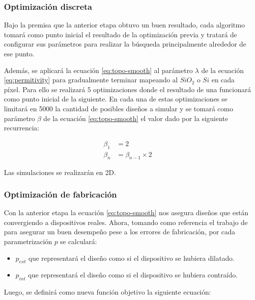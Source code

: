 \subsubsection{Optimización discreta}

Bajo la premisa que la anterior etapa obtuvo un buen resultado, cada algoritmo tomará como punto inicial el resultado de la optimización previa y tratará de configurar sus parámetros para realizar la búsqueda principalmente alrededor de ese punto.

Además, se aplicará la ecuación \ref{eq:topo-smooth} al parámetro $\lambda$ de la ecuación \ref{eq:permitivity} para gradualmente terminar mapeando al $SiO_2$ o $Si$ en cada píxel. 
Para ello se realizará 5 optimizaciones donde el resultado de una funcionará como punto inicial de la siguiente.
En cada una de estas optimizaciones se limitará en 5000 la cantidad de posibles diseños a simular y se tomará como parámetro $\beta$ de la ecuación \ref{eq:topo-smooth} el valor dado por la siguiente recurrencia:

\begin{equation}
  \begin{split}
    \beta_1 &= 2\\
    \beta_n &= \beta_{n-1} \times 2
  \end{split}
  \label{eq:beta-param}
\end{equation}

Las simulaciones se realizarán en 2D.

\subsubsection{Optimización de fabricación}

Con la anterior etapa la ecuación \ref{eq:topo-smooth} nos asegura diseños que están convergiendo a dispositivos reales.
Ahora, tomando como referencia el trabajo de \cite{Hammond20} para asegurar un buen desempeño pese a los errores de fabricación, por cada parametrización $p$ se calculará:

\begin{itemize}
  \item $p_{ext}$ que representará el diseño como si el dispositivo se hubiera dilatado.
  \item $p_{int}$ que representará el diseño como si el dispositivo se hubiera contraído.
\end{itemize}

Luego, se definirá como nueva función objetivo la siguiente ecuación:

